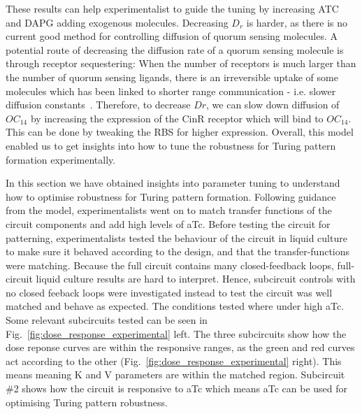 These results can help experimentalist to guide the tuning by increasing ATC and DAPG adding exogenous molecules.
Decreasing $D_{r}$ is harder, as there is no current good method for controlling diffusion of quorum sensing molecules.
A potential route of decreasing the diffusion rate of a quorum sensing molecule is through receptor sequestering:
When the number of receptors is much larger than the number of quorum sensing ligands,
there is an irreversible uptake of some molecules which has been linked to shorter range communication -
i.e. slower diffusion constants~\parencite{vangestel}.
Therefore, to decrease $D{r}$,
we can slow down diffusion of $OC_{14}$ by increasing the expression of the CinR receptor which will bind to $OC_{14}$.
This can be done by tweaking the RBS for higher expression.
Overall,
this model enabled us to get insights into how to tune the robustness for Turing pattern formation experimentally.

In this section we have obtained insights into parameter tuning
to understand how to optimise robustness for Turing pattern formation.
Following guidance from the model,
experimentalists went on to match transfer functions of the circuit components and add high levels of aTc.
Before testing the circuit for patterning,
experimentalists tested the behaviour of the circuit in liquid culture to make sure it behaved according to the design,
and that the transfer-functions were matching.
Because the full circuit contains many closed-feedback loops, full-circuit liquid culture results are hard to interpret.
Hence,
subcircuit controls with no closed feeback loops were investigated
instead to test the circuit was well matched and behave as expected.
The conditions tested where under high aTc.
Some relevant subcircuits tested can be seen in Fig.~\ref{fig:dose_response_experimental} left.
The three subcircuits show how the dose reponse curves are within the responsive ranges, as the green and red curves act according to the other (Fig.~\ref{fig:dose_response_experimental} right).
This means meaning K and V parameters are within the matched region.
Subcircuit \#2 shows how the circuit is responsive to aTc which means aTc can be used for optimising Turing pattern robustness.

